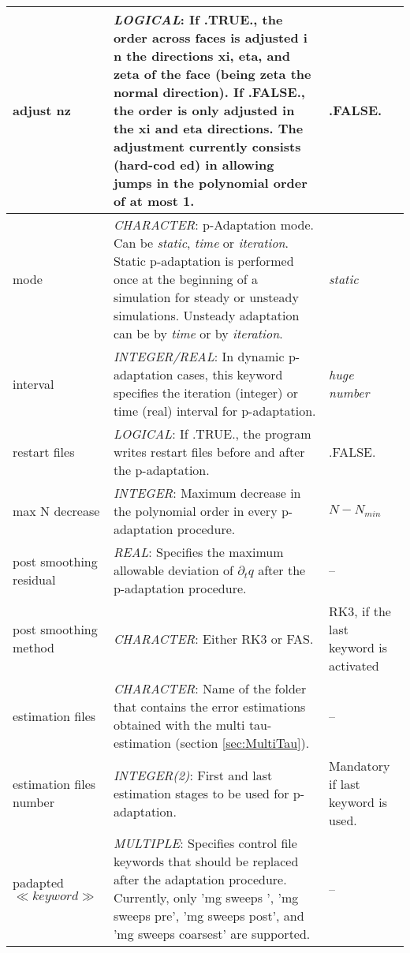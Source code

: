 \documentclass[a4paper,10pt]{report}
\begin{document}
\begin{longtable}{|p{4cm}|p{10cm}|p{2.2cm}|}
adjust nz &
			\textit{LOGICAL}: If .TRUE., the order across faces is adjusted i    n the directions xi, eta, and zeta of the face (being zeta the normal direction). If .FALSE., the     order is only adjusted in the xi and eta directions. The adjustment currently consists (hard-cod    ed) in allowing jumps in the polynomial order of at most 1. &
					.FALSE. \\ \hline

mode &
			\textit{CHARACTER}: p-Adaptation mode. Can be \textit{static}, \textit{time} or \textit{iteration}. Static p-adaptation is performed once at the beginning of a simulation for steady or unsteady simulations. Unsteady adaptation can be by \textit{time} or by \textit{iteration}. &
					\textit{static} \\ \hline

interval &
			\textit{INTEGER/REAL}: In dynamic p-adaptation cases, this keyword specifies the iteration (integer) or time (real) interval for p-adaptation. &
					\textit{huge number} \\ \hline

restart files &
			\textit{LOGICAL}: If .TRUE., the program writes restart files before and after the p-adaptation. &
					.FALSE. \\ \hline

max N decrease &
			\textit{INTEGER}: Maximum decrease in the polynomial order in every p-adaptation procedure. &
					$N-N_{\textit{min}}$ \\ \hline

post smoothing residual &
			\textit{REAL}: Specifies the maximum allowable deviation of $\partial_t q$ after the p-adaptation procedure. &
					-- \\ \hline

post smoothing method &
			\textit{CHARACTER}: Either RK3 or FAS. &
					RK3, if the last keyword is activated \\ \hline

estimation files &
			\textit{CHARACTER}: Name of the folder that contains the error estimations obtained with the multi tau-estimation (section \ref{sec:MultiTau}). &
					-- \\ \hline

estimation files number &
			\textit{INTEGER(2)}: First and last estimation stages to be used for p-adaptation. &
					Mandatory if last keyword is used. \\ \hline

padapted $\ll \textit{keyword} \gg$ &
			\textit{MULTIPLE}: Specifies control file keywords that should be replaced after the adaptation procedure. Currently, only 'mg sweeps         ', 'mg sweeps pre', 'mg sweeps post', and 'mg sweeps coarsest' are supported. &
					-- \\ \hline

\end{longtable}
\end{document}
